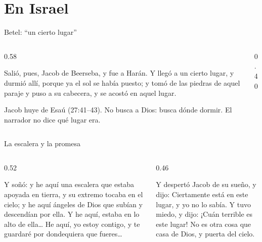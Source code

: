 \section{En Israel}

\begin{frame}{Betel: ``un cierto lugar''}
\begin{columns}[c,onlytextwidth]
\begin{column}{0.58\textwidth}
\begin{cita}[fontupper=\scriptsize\itshape]Salió, pues, Jacob de Beerseba, y fue a Harán. Y llegó a un cierto lugar, y durmió allí, porque ya el sol se había puesto; y tomó de las piedras de aquel paraje y puso a su cabecera, y se acostó en aquel lugar.\end{cita}
\small Jacob huye de Esaú (27:41--43). No busca a Dios: busca dónde dormir. El narrador no dice qué lugar era.
\end{column}
\begin{column}{0.40\textwidth}\end{column}
\end{columns}
\end{frame}

\begin{frame}{La escalera y la promesa}
\begin{columns}[t,onlytextwidth]
\begin{column}{0.52\textwidth}
\begin{cita}[fontupper=\scriptsize\itshape]Y soñó: y he aquí una escalera que estaba apoyada en tierra, y su extremo tocaba en el cielo; y he aquí ángeles de Dios que subían y descendían por ella. Y he aquí, \SENOR{} estaba en lo alto de ella\ldots{} He aquí, yo estoy contigo, y te guardaré por dondequiera que fueres\ldots{}\end{cita}
\end{column}
\begin{column}{0.46\textwidth}
\begin{cita}[fontupper=\scriptsize\itshape]Y despertó Jacob de su sueño, y dijo: Ciertamente \SENOR{} está en este lugar, y yo no lo sabía. Y tuvo miedo, y dijo: ¡Cuán terrible es este lugar! No es otra cosa que casa de Dios, y puerta del cielo.\end{cita}
\begin{center}\scriptsize{}\end{center}
\end{column}
\end{columns}
\end{frame}

